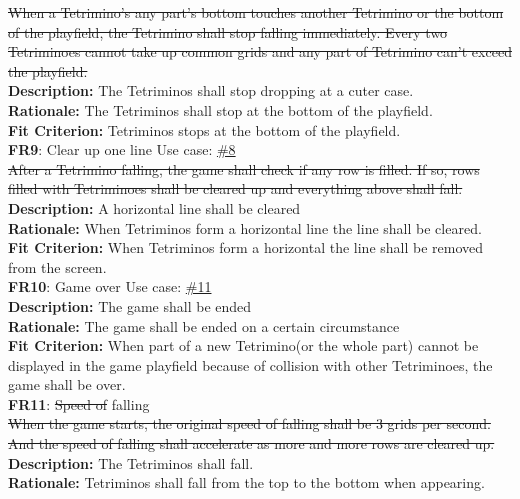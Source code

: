 \documentclass[12pt, titlepage]{article}
\begin{document}
\st{When a Tetrimino's any part's bottom touches another Tetrimino or the bottom of the playfield, the Tetrimino shall stop falling immediately. Every two Tetriminoes cannot take up common grids and any part of Tetrimino can't exceed the playfield.}\\
 \textbf{Description:} {\color{red}    The Tetriminos shall stop dropping at a cuter case. } \\ 
\textbf{Rationale: }{\color{red}     The Tetriminos shall stop at the bottom of the playfield.} \\ 
\textbf{Fit Criterion:} {\color{red}    Tetriminos stops at the bottom of the playfield.} \\
\newline
\textbf{FR9}: Clear up one line \tab Use case: \hyperref[event:Clearrow]{\#8} \\
\st{After a Tetrimino falling, the game shall check if any row is filled. If so, rows filled with Tetriminoes shall be cleared up and everything above shall fall.}\\
 \textbf{Description:} {\color{red}    A horizontal line shall be cleared} \\ 
\textbf{Rationale: }{\color{red}     When Tetriminos form a horizontal line the line shall be cleared.} \\ 
\textbf{Fit Criterion:} {\color{red}    When Tetriminos form a horizontal the line shall be removed from the screen.} \\
\newline
\textbf{FR10}: Game over \tab Use case: \hyperref[event:usesitem]{\#11} \\
 \textbf{Description:} {\color{red}    The game shall be ended} \\ 
\textbf{Rationale: }{\color{red}     The game shall be ended on a certain circumstance} \\ 
 \textbf{Fit Criterion:} When part of a new Tetrimino(or the whole part) cannot be displayed in the game playfield because of collision with other Tetriminoes, the game shall be over.\\
\newline
\textbf{FR11}: \st{Speed of }falling\\
\st{When the game starts, the original speed of falling shall be 3 grids per second. And the speed of falling shall accelerate as more and more rows are cleared up.} \\
 \textbf{Description:} {\color{red}    The Tetriminos shall fall.} \\ 
\textbf{Rationale: }{\color{red}     Tetriminos shall fall from the top to the bottom when appearing.} \\ 
\end{document}
